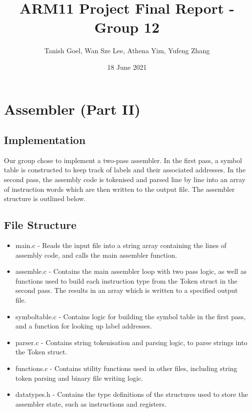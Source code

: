 \documentclass[a4paper,11pt]{article}
\begin{document}
\title{\vspace{-1.0cm}ARM11 Project Final Report - Group 12}
\author{Tanish Goel, Wan Sze Lee, Athena Yim, Yufeng Zhang}
\date{18 June 2021}
\maketitle

\section{Assembler (Part II)}
\subsection{Implementation}
Our group chose to implement a two-pass assembler. In the first pass, a symbol table is constructed to keep track of labels and their associated addresses. In the second pass, the assembly code is tokenised and parsed line by line into an array of instruction words which are then written to the output file. The assembler structure is outlined below.

\subsection{File Structure}
\begin{itemize}
\item main.c - Reads the input file into a string array containing the lines of assembly code, and calls the main assembler function.
\item assemble.c - Contains the main assembler loop with two pass logic, as well as functions used to build each instruction type from the Token struct in the second pass. The results in an array which is written to a specified output file.
\item symboltable.c - Contains logic for building the symbol table in the first pass, and a function for looking up label addresses.
\item parser.c - Contains string tokenisation and parsing logic, to parse strings into the Token struct.
\item functions.c - Contains utility functions used in other files, including string token parsing and binary file writing logic.
\item datatypes.h - Contains the type definitions of the structures used to store the assembler state, such as instructions and registers.
\end{itemize}
\end{document}
